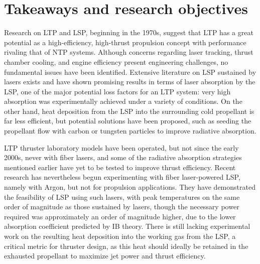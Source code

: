     \section{Takeaways and research objectives}
        Research on LTP and LSP, beginning in the 1970s, suggest that LTP has a great potential as a high-efficiency, high-thrust propulsion concept with performance rivaling that of NTP systems. Although concerns regarding laser tracking, thrust chamber cooling, and engine efficiency present engineering challenges, no fundamental issues have been identified. Extensive literature on LSP sustained by  lasers exists and have shown promising results in terms of laser absorption by the LSP, one of the major potential loss factors for an LTP system: very high absorption was experimentally achieved under a variety of conditions. On the other hand, heat deposition from the LSP into the surrounding cold propellant is far less efficient, but potential solutions have been proposed, such as seeding the propellant flow with carbon or tungsten particles to improve radiative absorption.

        LTP thruster laboratory models have been operated, but not since the early 2000s, never with fiber lasers, and some of the radiative absorption strategies mentioned earlier have yet to be tested to improve thrust efficiency. Recent research has nevertheless begun experimenting with fiber laser-powered LSP, namely with Argon, but not for propulsion applications. They have demonstrated the feasibility of LSP using such lasers, with peak temperatures on the same order of magnitude as those sustained by  lasers, though the necessary power required was approximately an order of magnitude higher, due to the lower absorption coefficient predicted by IB theory. There is still lacking experimental work on the resulting heat deposition into the working gas from the LSP, a critical metric for thruster design, as this heat should ideally be retained in the exhausted propellant to maximize jet power and thrust efficiency.

